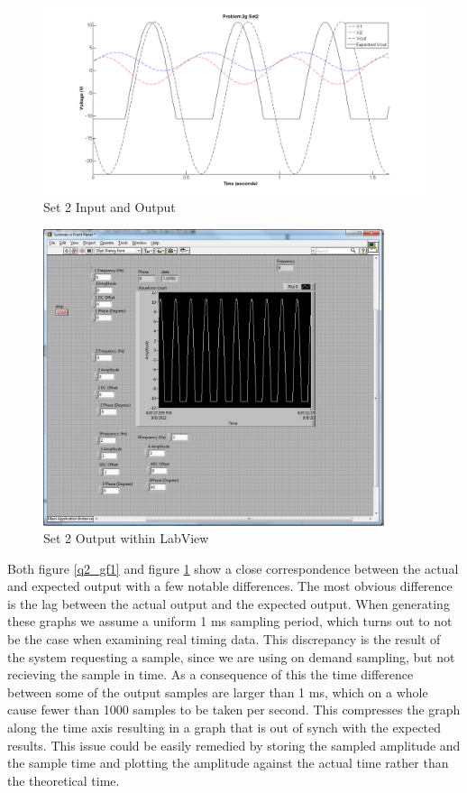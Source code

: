 \documentclass{article}
\theoremstyle{plain}
\theoremstyle{definition}
\theoremstyle{remark}
\begin{document}
\begin{figure}[h]
\begin{center}
\includegraphics[width = 15cm]{problem2g_set2.png}
\caption{Set 2 Input and Output}
\label{q2_gf2}
\end{center}
\end{figure}

\begin{figure}[h]
\begin{center}
\includegraphics[width = 10cm]{set2partgproblem2.png}
\caption{Set 2 Output within LabView}
\label{q2_gf3}
\end{center}
\end{figure}

Both figure \ref{q2_gf1} and figure \ref{q2_gf2} show a close correspondence between the actual and expected output with a few notable differences.  The most  obvious difference is the lag between the actual output and the expected output.  When generating these graphs we assume a uniform 1 ms sampling period, which turns out to not be the case when examining real timing data.  This discrepancy is the result of the system requesting a sample, since we are using on demand sampling, but not recieving the sample in time.  As a consequence of this the time difference between some of the output samples are larger than 1 ms, which on a whole cause fewer than 1000 samples to be taken per second.  This compresses the graph along the time axis resulting in a graph that is out of synch with the expected results.  This issue could be easily remedied by storing the sampled amplitude and the sample time and plotting the amplitude against the actual time rather than the theoretical time.  \\
\end{document}
